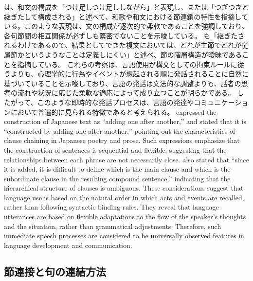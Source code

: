 \documentclass[a4paper]{article}
\begin{document}
\ifJPN
  \autocite{sakakura1975aj}は、和文の構成を「つけ足しつけ足ししながら」と表現し、また\autocite{komatu2003a}は「つぎつぎと継ぎたして構成される」と述べて、和歌や和文における節連鎖の特性を指摘している。このような表現は、文の構成が逐次的で柔軟であることを強調しており、各句節間の相互関係が必ずしも緊密でないことを示唆している。
  \autocite{kondo2005aj}も「継ぎたされるわけであるので、結果としてできた複文においては、どれが主節でどれが従属節かというようなことは定義しにくい」と述べ、節の階層構造が曖昧であることを指摘している。
  これらの考察は、言語使用が構文としての拘束ルールに従うよりも、心理学的に行為やイベントが想起される順に発話されることに自然に基づいていることを示唆しており、言語の発話は文法的な調整よりも、話者の思考の流れや状況に応じた柔軟な適応によって成り立つことが明らかである。
  したがって、このような即時的な発話プロセスは、言語の発達やコミュニケーションにおいて普遍的に見られる特徴であると考えられる。
\else
  \textcite{sakakura1975ae} expressed the construction of Japanese text as ``adding one after another,'' and \textcite{komatu2003ae} stated that it is ``constructed by adding one after another,'' pointing out the characteristics of clause chaining in Japanese poetry and prose. Such expressions emphasize that the construction of sentences is sequential and flexible, suggesting that the relationships between each phrase are not necessarily close. \textcite{kondo2005be} also stated that ``since it is added, it is difficult to define which is the main clause and which is the subordinate clause in the resulting compound sentence,'' indicating that the hierarchical structure of clauses is ambiguous. These considerations suggest that language use is based on the natural order in which acts and events are recalled, rather than following syntactic binding rules. They reveal that language utterances are based on flexible adaptations to the flow of the speaker's thoughts and the situation, rather than grammatical adjustments. Therefore, such immediate speech processes are considered to be universally observed features in language development and communication.
\fi

\ifJPN
  \subsection{節連接と句の連結方法}
\else
\end{document}
